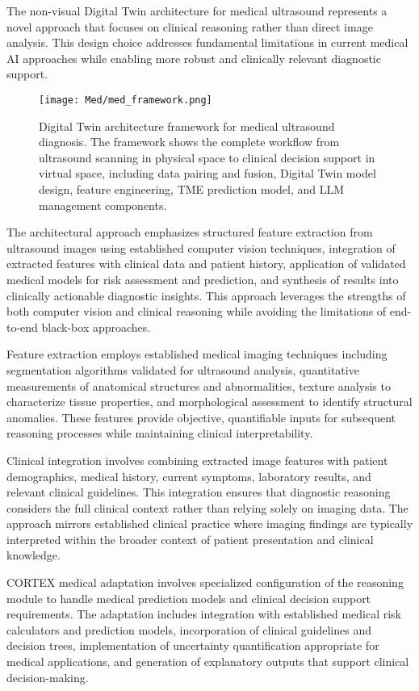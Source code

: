 The non-visual Digital Twin architecture for medical ultrasound represents a novel approach that focuses on clinical reasoning rather than direct image analysis. This design choice addresses fundamental limitations in current medical AI approaches while enabling more robust and clinically relevant diagnostic support.

\begin{figure}[htbp]
\centering
\texttt{[image: Med/med\_framework.png]}
\caption{Digital Twin architecture framework for medical ultrasound diagnosis. The framework shows the complete workflow from ultrasound scanning in physical space to clinical decision support in virtual space, including data pairing and fusion, Digital Twin model design, feature engineering, TME prediction model, and LLM management components.}
\label{fig:med_framework}
\end{figure}

The architectural approach emphasizes structured feature extraction from ultrasound images using established computer vision techniques, integration of extracted features with clinical data and patient history, application of validated medical models for risk assessment and prediction, and synthesis of results into clinically actionable diagnostic insights. This approach leverages the strengths of both computer vision and clinical reasoning while avoiding the limitations of end-to-end black-box approaches.

Feature extraction employs established medical imaging techniques including segmentation algorithms validated for ultrasound analysis, quantitative measurements of anatomical structures and abnormalities, texture analysis to characterize tissue properties, and morphological assessment to identify structural anomalies. These features provide objective, quantifiable inputs for subsequent reasoning processes while maintaining clinical interpretability.

Clinical integration involves combining extracted image features with patient demographics, medical history, current symptoms, laboratory results, and relevant clinical guidelines. This integration ensures that diagnostic reasoning considers the full clinical context rather than relying solely on imaging data. The approach mirrors established clinical practice where imaging findings are typically interpreted within the broader context of patient presentation and clinical knowledge.

CORTEX medical adaptation involves specialized configuration of the reasoning module to handle medical prediction models and clinical decision support requirements. The adaptation includes integration with established medical risk calculators and prediction models, incorporation of clinical guidelines and decision trees, implementation of uncertainty quantification appropriate for medical applications, and generation of explanatory outputs that support clinical decision-making.

